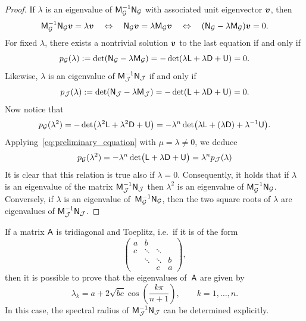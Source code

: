 \begin{proof}
    If $\lambda$ is an eigenvalue of $\mathsf M_{\mathcal G}^{-1} \mathsf N_{\mathcal G}$ with associated unit eigenvector $\mathbf{\boldsymbol{v}}$,
    then
    \[
        \mathsf M_{\mathcal G}^{-1} \mathsf N_{\mathcal G} \mathbf{\boldsymbol{v}} = \lambda \mathbf{\boldsymbol{v}}
        \quad \Leftrightarrow \quad
        \mathsf N_{\mathcal G} \mathbf{\boldsymbol{v}} = \lambda \mathsf M_{\mathcal G} \mathbf{\boldsymbol{v}}
        \quad \Leftrightarrow \quad
        (\mathsf N_{\mathcal G} - \lambda \mathsf M_{\mathcal G}) \mathbf{\boldsymbol{v}} = 0.
    \]
    For fixed $\lambda$,
    there exists a nontrivial solution $\mathbf{\boldsymbol{v}}$ to the last equation if and only if
    \[
        p_{\mathcal G}(\lambda) := \det (\mathsf N_{\mathcal G} - \lambda \mathsf M_{\mathcal G})
        = - \det (\lambda \mathsf L + \lambda \mathsf D + \mathsf U) = 0.
    \]
    Likewise, $\lambda$ is an eigenvalue of $\mathsf M_{\mathcal J}^{-1} \mathsf N_{\mathcal J}$ if and only if
    \[
        p_{\mathcal J}(\lambda) := \det (\mathsf N_{\mathcal J} - \lambda \mathsf M_{\mathcal J})
        = - \det (\mathsf L + \lambda \mathsf D + \mathsf U) = 0.
    \]
    Now notice that
    \[
        p_{\mathcal G}(\lambda^2)
        = - \det \bigl(\lambda^2 \mathsf L + \lambda^2 \mathsf D + \mathsf U\bigr)
        = - \lambda^n \det \bigl(\lambda \mathsf L + (\lambda \mathsf D) + \lambda^{-1} \mathsf U\bigr).
    \]
    Applying~\eqref{eq:preliminary_equation} with $\mu = \lambda \neq 0$,
    we deduce
    \[
        p_{\mathcal G}(\lambda^2)
        = - \lambda^n \det \bigl(\mathsf L + \lambda \mathsf D + \mathsf U\bigr)
        = \lambda^n p_{\mathcal J}(\lambda)
    \]
    It is clear that this relation is true also if $\lambda = 0$.
    Consequently, it holds that if $\lambda$ is an eigenvalue of the matrix $\mathsf M_{\mathcal J}^{-1} \mathsf N_{\mathcal J}$ then
    $\lambda^2$ is an eigenvalue of $\mathsf M_{\mathcal G}^{-1} \mathsf N_{\mathcal G}$.
    Conversely, if $\lambda$ is an eigenvalue of~$\mathsf M_{\mathcal G}^{-1} \mathsf N_{\mathcal G}$,
    then the two square roots of $\lambda$ are eigenvalues of $\mathsf M_{\mathcal J}^{-1} \mathsf N_{\mathcal J}$.
\end{proof}

If a matrix $\mathsf A$ is tridiagonal and Toeplitz,
i.e.\ if it is of the form
\[
    \begin{pmatrix}
        a & b \\
        c & \ddots & \ddots  \\
             & \ddots & \ddots & b \\
             & & c & a
    \end{pmatrix},
\]
then it is possible to prove that the eigenvalues of~$\mathsf A$ are given by
\begin{equation}
    \label{eq:linear_eigenvalues_toeplitz}
    \lambda_k =
    a + 2\sqrt{bc} \cos \left(\frac{k \pi}{n+1} \right),
    \qquad k = 1, \dots, n.
\end{equation}
In this case, the spectral radius of $\mathsf M_{\mathcal J}^{-1} \mathsf N_{\mathcal J}$ can be determined explicitly.


